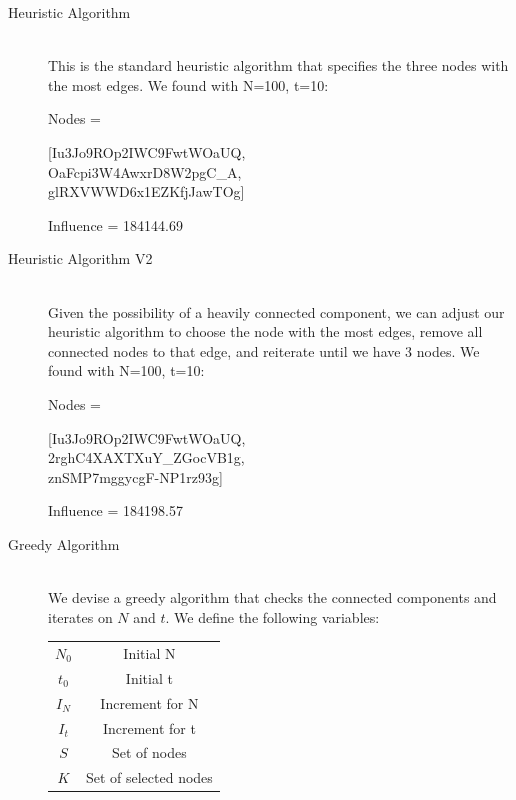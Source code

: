\documentclass{article}
\begin{document}
		\begin{description}
		\item[Heuristic Algorithm] \hfill \\
			This is the standard heuristic algorithm that specifies the three nodes with the most edges. We found with N=100, t=10:

			Nodes = \begin{center}
					[Iu3Jo9ROp2IWC9FwtWOaUQ,\\
					OaFcpi3W4AwxrD8W2pgC\_A,\\
 					glRXVWWD6x1EZKfjJawTOg]\\
			 		\end{center}

			 Influence = 184144.69

		\item[Heuristic Algorithm V2] \hfill \\
			Given the possibility of a heavily connected component, we can adjust our heuristic algorithm to choose the node with the most edges, remove all connected nodes to that edge, and reiterate until we have 3 nodes. We found with N=100, t=10:

			Nodes = \begin{center}
					[Iu3Jo9ROp2IWC9FwtWOaUQ,\\
 					2rghC4XAXTXuY\_ZGocVB1g,\\
 					znSMP7mggycgF-NP1rz93g]\\
			 		\end{center}

			 Influence = 184198.57

		\item[Greedy Algorithm] \hfill \\
			We devise a greedy algorithm that checks the connected components and iterates on $N$ and $t$. We define the following variables:

		    \begin{tabular}{|c|c|} 
		      \hline
		      $N_0$ & Initial N \\
		      $t_0$ & Initial t \\
		      $I_N$ & Increment for N \\
		      $I_t$ & Increment for t \\
		      $S$ & Set of nodes \\
		      $K$ & Set of selected nodes \\
		      \hline
		    \end{tabular}	


\end{description}
\end{document}
